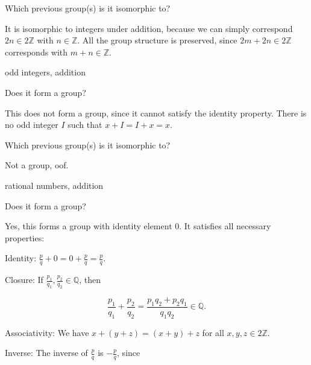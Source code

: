 \documentclass[../key.tex]{subfiles}
\begin{document}
\begin{iinner_problem}
\item Which previous group(s) is it isomorphic to?
\end{iinner_problem}

\noindent It is isomorphic to integers under addition, because we can simply correspond $2n\in 2\mathbb{Z}$ with $n\in\mathbb{Z}$. All the group structure is preserved, since $2m+2n\in 2\mathbb{Z}$ corresponds with $m+n\in\mathbb{Z}$.

\begin{inner_problem}
\item odd integers, addition
\end{inner_problem}

\begin{iinner_problem}[start=1]
\item Does it form a group?
\end{iinner_problem}

\noindent This does not form a group, since it cannot satisfy the identity property. There is no odd integer $I$ such that $x+I=I+x=x$.

\begin{iinner_problem}
\item Which previous group(s) is it isomorphic to?
\end{iinner_problem}

\noindent Not a group, oof.

\begin{inner_problem}
\item rational numbers, addition
\end{inner_problem}

\begin{iinner_problem}[start=1]
\item Does it form a group?
\end{iinner_problem}

\noindent Yes, this forms a group with identity element $0$. It satisfies all necessary properties:

Identity: $\frac{p}{q}+0=0+\frac{p}{q}=\frac{p}{q}$.

Closure: If $\frac{p_1}{q_1},\frac{p_2}{q_2}\in \mathbb{Q}$, then

$$\frac{p_1}{q_1}+\frac{p_2}{q_2}=\frac{p_1q_2+p_2q_1}{q_1q_2}\in \mathbb{Q}.$$

Associativity: We have $x+(y+z)=(x+y)+z$ for all $x,y,z \in 2\mathbb{Z}$.

Inverse: The inverse of $\frac{p}{q}$ is $-\frac{p}{q}$, since
\end{document}
